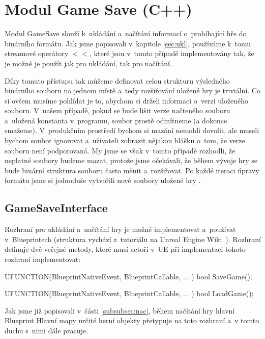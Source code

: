 
\section{Modul Game Save (C++)}

Modul GameSave slouží k~ukládání a~načítání informací o~probíhající hře do binárního formátu. Jak jsme popisovali v~kapitole \ref{sec:ukl}, používáme k~tomu streamové operátory $<<$, které jsou v~tomto případě implementovány tak, že je možné je použít jak pro ukládání, tak pro načítání.

Díky tomuto přístupu tak můžeme definovat celou strukturu výsledného binárního souboru na jednom místě a~tedy rozšiřování uložené hry je triviální. Co si ovšem musíme pohlídat je to, abychom si drželi informaci o~verzi uloženého souboru. V~našem případě, pokud se bude lišit verze načteného souboru a~uložená konstanta v~programu, soubor prostě odmítneme (a dokonce smažeme). V~produkčním prostředí bychom si mazání nemohli dovolit, ale museli bychom soubor ignorovat a~uživateli zobrazit nějakou hlášku o~tom, že verze souboru není podporovaná. My jsme se však v~tomto případě rozhodli, že neplatné soubory budeme mazat, protože jsme očekávali, že během vývoje hry se bude binární struktura souboru často měnit a~rozšiřovat. Po každé iteraci úpravy formátu jsme si jednoduše vytvořili nové soubory uložené hry .


\subsection{GameSaveInterface}
\label{subsec:gsi}
Rozhraní pro ukládání a~načítání hry  je možné implementovat a~používat v~Blueprintech (struktura vychází z~tutoriálu na Unreal Engine Wiki~\citep{ue_interfaces_tut}). Rozhraní definuje dvě veřejné metody, které musí actoři v~UE při implementaci tohoto rozhraní implementovat:

\begin{code}
UFUNCTION(BlueprintNativeEvent, BlueprintCallable, ... )
	bool SaveGame();

UFUNCTION(BlueprintNativeEvent, BlueprintCallable, ... )
	bool LoadGame();
\end{code}

Jak jsme již popisovali v~části \ref{subsubsec:nac}, během načítání hry hlavní Blueprint Hlavní mapy určité herní objekty přetypuje na toto rozhraní a~v tomto duchu s~nimi dále pracuje.

